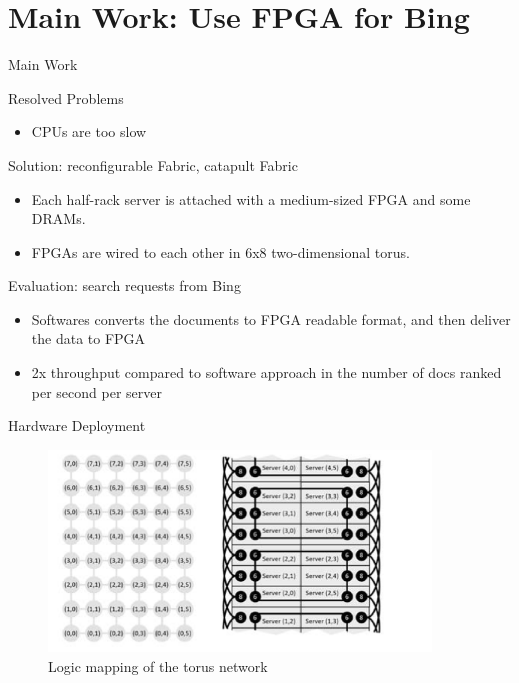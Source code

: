 \documentclass[t]{beamer}
\begin{document}
\section{Main Work: Use FPGA for Bing}
\begin{frame}{Main Work}
    \begin{block}{Resolved Problems}
        \begin{itemize}
            \item CPUs are too slow
        \end{itemize}
    \end{block}

    \begin{block}{Solution: reconfigurable Fabric, catapult Fabric}
        \begin{itemize}
            \item Each half-rack server is attached with a medium-sized FPGA and some DRAMs.
            \item FPGAs are wired to each other in 6x8 two-dimensional torus.
        \end{itemize}
    \end{block}

    \begin{block}{Evaluation: search requests from Bing}
        \begin{itemize}
            \item Softwares converts the documents to FPGA readable format, and then deliver the
            data to FPGA
            \item 2x throughput compared to software approach in the number of docs ranked per
            second per server
        \end{itemize}
    \end{block}
\end{frame}

\begin{frame}{Hardware Deployment}
    \begin{figure}
        \includegraphics[width=4in]{img/torus-network.png}
        \caption{Logic mapping of the torus network}
        \label{fig:torus-network}
    \end{figure}
\end{frame}
\end{document}
